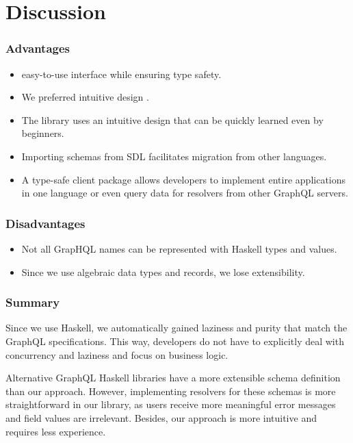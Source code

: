 \section{Discussion}

    
\begin{frame}\frametitle{Advantages}

\begin{itemize}
    \item easy-to-use interface while ensuring type safety.
    \item We preferred intuitive design .
    \item The library uses an intuitive design that can be quickly learned even by beginners.
    \item Importing schemas from SDL facilitates migration from other languages.
    \item A type-safe client package allows developers to implement entire applications in one language or even query data for resolvers from other GraphQL servers.
\end{itemize}

\end{frame}

\begin{frame}\frametitle{Disadvantages}

\begin{itemize}
    \item Not all GrapHQL names can be represented with Haskell types and values.
    \item Since we use algebraic data types and records, we lose extensibility.
\end{itemize}

\end{frame}

\begin{frame}\frametitle{Summary}
    
    Since we use Haskell, we automatically gained laziness and purity that match the GraphQL specifications. This way, developers do not have to explicitly deal with concurrency and laziness and focus on business logic. 

    Alternative GraphQL Haskell libraries have a more extensible schema definition than our approach. However, implementing resolvers for these schemas is more straightforward in our library, as users receive more meaningful error messages and field values are irrelevant. Besides, our approach is more intuitive and requires less experience.
    
\end{frame}

